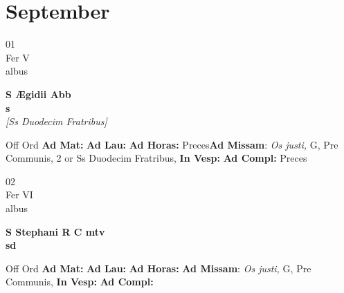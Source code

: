\documentclass[10pt, openany]{book}
\begin{document}
        \chapter{September}
                        
        \begin{center}
            \begin{minipage}{3.5in}
                \vspace{2em}
                \begin{minipage}{0.5in}
                    {\Huge 01} \\
                    {\normalsize Fer V} \\
                    {\normalsize albus}
                \end{minipage}
                \begin{minipage}{3.0in}
                    \textbf{ \large S Ægidii Abb \\
                    \textnormal{\normalsize s}} \\ \textit{[Ss Duodecim Fratribus]} \\ 
                \end{minipage}
                \begin{justify}Off Ord
                    \textbf{Ad Mat: }
                    \textbf{Ad Lau: }
                    \textbf{Ad Horas: }Preces\textbf{Ad Missam}: \textit{Os justi,} G, Pre Communis, 2 or Ss Duodecim Fratribus,  
                    \textbf{In Vesp: }
                    \textbf{Ad Compl: }Preces
                \end{justify}
            \end{minipage}
        \end{center}
    
        \begin{center}
            \begin{minipage}{3.5in}
                \vspace{2em}
                \begin{minipage}{0.5in}
                    {\Huge 02} \\
                    {\normalsize Fer VI} \\
                    {\normalsize albus}
                \end{minipage}
                \begin{minipage}{3.0in}
                    \textbf{ \large S Stephani R C mtv \\
                    \textnormal{\normalsize sd}} \\ 
                \end{minipage}
                \begin{justify}Off Ord
                    \textbf{Ad Mat: }
                    \textbf{Ad Lau: }
                    \textbf{Ad Horas: }\textbf{Ad Missam}: \textit{Os justi,} G, Pre Communis,  
                    \textbf{In Vesp: }
                    \textbf{Ad Compl: }
                \end{justify}
            \end{minipage}
        \end{center}
    
\end{document}
